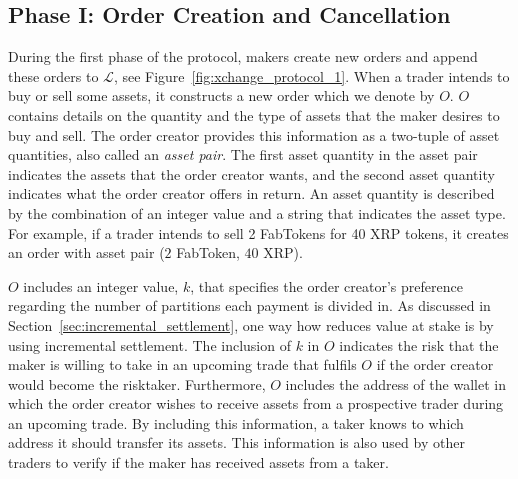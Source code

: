 \subsection*{Phase I: Order Creation and Cancellation}
\label{sec:phase_matching}

During the first phase of the \ModelName{} protocol, makers create new orders and append these orders to $ \mathcal{L} $, see Figure~\ref{fig:xchange_protocol_1}.
When a trader intends to buy or sell some assets, it constructs a new order which we denote by $ O $.
$ O $ contains details on the quantity and the type of assets that the maker desires to buy and sell.
The order creator provides this information as a two-tuple of asset quantities, also called an \emph{asset pair}.
The first asset quantity in the asset pair indicates the assets that the order creator wants, and the second asset quantity indicates what the order creator offers in return.
An asset quantity is described by the combination of an integer value and a string that indicates the asset type.
For example, if a trader intends to sell 2 FabTokens for 40 XRP tokens, it creates an order with asset pair ($ 2 $ FabToken, $ 40 $ XRP).

$ O $ includes an integer value, $ k $, that specifies the order creator's preference regarding the number of partitions each payment is divided in.
As discussed in Section~\ref{sec:incremental_settlement}, one way how \ModelName{} reduces value at stake is by using incremental settlement.
The inclusion of $ k $ in $ O $ indicates the risk that the maker is willing to take in an upcoming trade that fulfils $ O $ if the order creator would become the risktaker.
Furthermore, $ O $ includes the address of the wallet in which the order creator wishes to receive assets from a prospective trader during an upcoming trade.
By including this information, a taker knows to which address it should transfer its assets.
This information is also used by other traders to verify if the maker has received assets from a taker.


